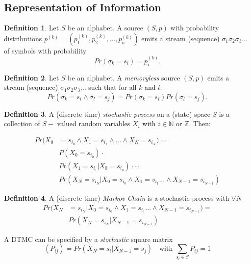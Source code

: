 \documentclass[a4paper]{article}
\theoremstyle{definition} \newtheorem*{definition}{Definition}
\newcommand{\naturals}{\mathbb{N}}
\newcommand{\integers}{\mathbb{Z}}
\begin{document}
\subsection{Representation of Information}
\begin{definition}
  Let $S$ be an alphabet. A source $(S,p)$ with probability distributions
  $p^{(k)} = \left( p_1^{(k)}, p_2^{(k)}, \dots , p_n^{(k)} \right)$ emits
  a stream (sequence) $\sigma_1\sigma_2\sigma_3 \dots$ of symbols with
  probability
  \[
    Pr(\sigma_k = s_i) = p_i^{(k)}.
  \]
\end{definition}
\begin{definition}
  Let $S$ be an alphabet. A \emph{memoryless} source $(S,p)$ emits
  a stream (sequence) $\sigma_1\sigma_2\sigma_3 \dots$ 
  such that for all $k$ and $l$:
  \[
    Pr(\sigma_k = s_i \land \sigma_l = s_j) = Pr(\sigma_k =
    s_i)Pr(\sigma_l = s_j).
  \]
\end{definition}

\begin{definition}
  A (discrete time) \emph{stochastic process} on a (state) space $S$ is
  a collection of $S-$ valued random variables $X_i$ with $i \in
  \naturals$ or $\integers$. Then:

  \begin{align*}
    Pr(X_0 &= s_{i_0} \land X_1 = s_{i_1} \land \dots 
    \land X_N = s_{i_N}) = \\
    &P(X_0 = s_{i_0}) \cdot \\
     &Pr( X_1 = s_{i_1} | X_0 = s_{i_0}) \cdot \cdots \\
     &Pr(X_N = s_{i_N} | X_0 = s_{i_0} \land X_1 = s_{i_1} \dots \land
    X_{N-1} = s_{i_{N-1}})
  \end{align*}
\end{definition}

\begin{definition}
  A (discrete time) \emph{Markov Chain} is a stochastic process with
  $\forall N$
  \begin{align*}
    Pr(X_N &= s_{i_N} | X_0 = s_{i_0} \land X_1 = s_{i_1} \dots \land
        X_{N-1} = s_{i_{N-1}}) = \\
        &Pr(X_N = s_{i_N} | X_{N-1} = s_{i_{N-1}})
  \end{align*}

  A DTMC can be specified by a \emph{stochastic} square matrix
  \[
    (P_{ij}) = Pr(X_N = s_i | X_{N-1} = s_j) \quad \text{with } 
    \sum_{s_i \in S} P_{ij} = 1
  \]
\end{definition}
\end{document}
